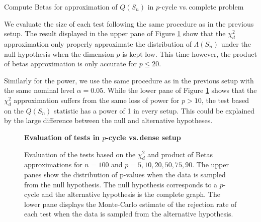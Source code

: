 \begin{algorithm}[t!]
    \caption{Compute Betas for approximation of $Q(S_n)$ in $p$-cycle vs.\,complete problem}
    \label{alg:comp-beta}
    \begin{algorithmic}[1]

                \EndIf
                


            \EndFor
        \EndFor
    \end{algorithmic}
\end{algorithm}

We evaluate the size of each test following the same procedure as in the previous setup. The result displayed in the upper pane of Figure \ref{fig-complete-to-pcycle} show that the $\chi^2_d$ approximation only properly approximate the distribution of $\Lambda(S_n)$ under the null hypothesis when the dimension $p$ is kept low. This time however, the product of betas approximation is only accurate for $p \leq 20$.

Similarly for the power, we use the same procedure as in the previous setup with the same nominal level $\alpha = 0.05$. While the lower pane of Figure \ref{fig-complete-to-pcycle} shows that the $\chi^2_d$ approximation suffers from the same loss of power for $p > 10$, the test based on the $Q(S_n)$ statistic has a power of 1 in every setup. This could be explained by the large difference between the null and alternative hypotheses.

\begin{figure}[!tbp]
    \textbf{Evaluation of tests in $p$-cycle vs.\,dense setup}
    \centering
    \qquad
    \caption{Evaluation of the tests based on the $\chi^2_d$ and product of Betas approximations for $n = 100$ and $p = 5, 10, 20, 50, 75, 90$. The upper panes show the distribution of p-values when the data is sampled from the null hypothesis. The null hypothesis corresponds to a $p$-cycle and the alternative hypothesis is the complete graph. The lower pane displays the Monte-Carlo estimate of the rejection rate of each test when the data is sampled from the alternative hypothesis.}
    \label{fig-complete-to-pcycle}
\end{figure}
